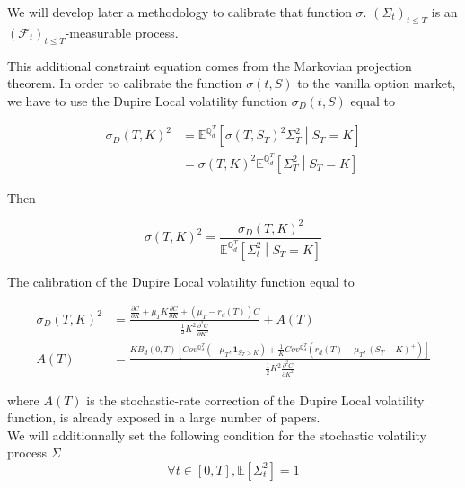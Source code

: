 \documentclass{article}
\begin{document}
\noindent We will develop later a methodology to calibrate that function $\sigma$. $\left(\Sigma_t\right)_{t \leq T}$ is an $\left(\mathcal{F}_t\right)_{t \leq T}$-measurable process.

\noindent This additional constraint equation comes from the Markovian projection theorem. In order to calibrate the function $\sigma(t,S)$ to the vanilla option market, we have to use the Dupire Local volatility function $\sigma_D(t,S)$ equal to 

\begin{equation}
	\begin{aligned}
		\sigma_D(T,K)^2 &= \mathbb{E}^{\mathbb{Q}_d^T}\left[\sigma(T,S_T)^2 \Sigma_T^2\middle|S_T=K\right]\\
		&= \sigma(T,K)^2 \mathbb{E}^{\mathbb{Q}_d^T}\left[\Sigma_T^2\middle| S_T= K \right]
	\end{aligned}
\end{equation}

\noindent Then

\begin{equation}
	\sigma(T,K)^2 = \frac{\sigma_D(T,K)^2}{\mathbb{E}^{\mathbb{Q}_d^T}\left[\Sigma^2_t\middle| S_T= K \right]}
\end{equation}

\noindent The calibration of the Dupire Local volatility function equal to 

\begin{equation}
\begin{aligned}
	\sigma_D(T,K)^2 &= \frac{\frac{\partial C}{\partial K} + \mu_T K \frac{\partial C}{\partial K} + \left(\mu_T - r_d(T)\right) C}{\frac{1}{2}K^2 \frac{\partial^2 C}{\partial K^2}} + A(T)\\
	A(T) &= \frac{KB_d(0,T) \left[Cov^{\mathbb{Q}_d^T}\left(-\mu_T, \textbf{1}_{S_T>K}\right) + \frac{1}{K} Cov^{\mathbb{Q}_d^T}\left(r_d(T)-\mu_T, \left(S_T-K\right)^+\right)\right]}{\frac{1}{2}K^2 \frac{\partial^2 C}{\partial K^2}}
\end{aligned}
\end{equation}

\noindent where $A(T)$ is the stochastic-rate correction of the Dupire Local volatility function, is already exposed in a large number of papers.\\

\noindent We will additionnally set the following condition for the stochastic volatility process $\Sigma$ 
\begin{equation}
	\label{eq:AdditionalConditionStochVol}
	\forall t \in [0,T], \mathbb{E}\left[\Sigma_t^2 \right] = 1
\end{equation}
\end{document}
